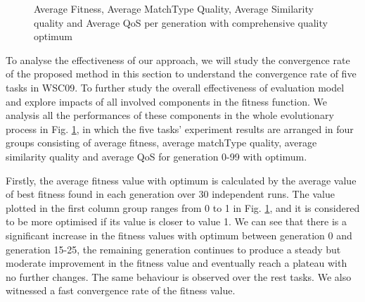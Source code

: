 \documentclass{llncs}
\begin{document}
\begin{figure}[h]
\centerline{
}
 \caption{Average Fitness, Average MatchType Quality, Average Similarity quality and Average QoS per generation with comprehensive quality optimum}
 \label{exp_fitnessvalue}
\end{figure}


To analyse the effectiveness of our approach, we will study the convergence rate of the proposed method in this section to understand the convergence rate of five tasks in WSC09. To further study the overall effectiveness of evaluation model and explore impacts of all involved components in the fitness function. We analysis all the performances of these components in the whole evolutionary process in Fig. \ref{exp_fitnessvalue}, in which the five tasks' experiment results are arranged in four groups consisting of average fitness, average matchType quality, average similarity quality and average QoS for generation 0-99 with optimum.

Firstly, the average fitness value with optimum is calculated by the average value of best fitness found in each generation over 30 independent runs. The value plotted in the first column group ranges from 0 to 1 in Fig. \ref{exp_fitnessvalue}, and it is considered to be more optimised if its value is closer to value 1. We can see that there is a significant increase in the fitness values with optimum between generation 0 and generation 15-25, the remaining generation continues to produce a steady but moderate improvement in the fitness value and eventually reach a plateau with no further changes. The same behaviour is observed over the rest tasks. We also witnessed a fast convergence rate of the fitness value.
\end{document}
